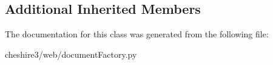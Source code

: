 \subsection*{Additional Inherited Members}


The documentation for this class was generated from the following file\-:\begin{DoxyCompactItemize}
\item 
cheshire3/web/document\-Factory.\-py\end{DoxyCompactItemize}
